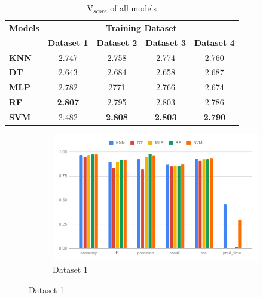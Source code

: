 \begin{table}[H]
  \centering
  \caption{V$_{score}$ of all models}
  \label{tab:v_score_of_models}
  \begin{tabular}{|l|c|c|c|c|}
    \hline
    \textbf{Models} & \multicolumn{4}{c|}{\bfseries Training Dataset}                                                                \\
    \cline{2-5}
                    & \textbf{Dataset 1}                              & \textbf{Dataset 2} & \textbf{Dataset 3} & \textbf{Dataset 4} \\
    \hline
    \textbf{KNN}    & 2.747                                           & 2.758              & 2.774              & 2.760              \\
    \textbf{DT}     & 2.643                                           & 2.684              & 2.658              & 2.687              \\
    \textbf{MLP}    & 2.782                                           & 2771               & 2.766              & 2.674              \\
    \textbf{RF}     & \textbf{2.807}                                  & 2.795              & 2.803              & 2.786              \\
    \textbf{SVM}    & 2.482                                           & \textbf{2.808}     & \textbf{2.803}     & \textbf{2.790}     \\
    \hline
  \end{tabular}
\end{table}

\begin{figure}[H]
  \begin{subfigure}{.9\columnwidth}
    \centering
    \includegraphics[width=0.9\columnwidth]{media/data/performance/perf_ds_1.pdf}
    \caption{Dataset 1}
    \label{fig:perfromance_results_dataset_1}
  \end{subfigure}%
\end{figure}

